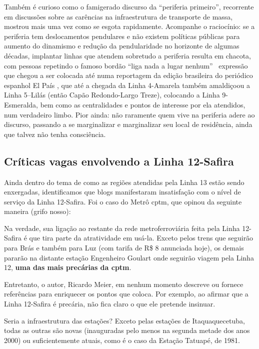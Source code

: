 \documentclass[11pt,fleqn]{book} %
\begin{document}
Também é curioso como o famigerado discurso da “periferia primeiro”, recorrente em discussões sobre as carências na infraestrutura de transporte de massa, mostrou mais uma vez como se esgota rapidamente. Acompanhe o raciocínio: se a periferia tem deslocamentos pendulares e não existem políticas públicas para aumento do dinamismo e redução da pendularidade no horizonte de algumas décadas, implantar linhas que atendem sobretudo a periferia resulta em chacota, com pessoas repetindo o famoso bordão “liga nada a lugar nenhum” \textemdash\ expressão que chegou a ser colocada até numa reportagem da edição brasileira do periódico espanhol El País \textemdash, que até a chegada da Linha 4-Amarela também amaldiçoou a Linha 5–Lilás (então Capão Redondo-Largo Treze), colocando a Linha 9-Esmeralda, bem como as centralidades e pontos de interesse por ela atendidos, num verdadeiro limbo. Pior ainda: não raramente quem vive na periferia adere ao discurso, passando a se marginalizar e marginalizar seu local de residência, ainda que talvez não tenha consciência.

\subsection{Críticas vagas envolvendo a Linha 12-Safira}

Ainda dentro do tema de como as regiões atendidas pela Linha 13 estão sendo enxergadas, identificamos que blogs manifestaram insatisfação com o nível de serviço da Linha 12-Safira. Foi o caso do Metrô \gls{cptm}, que opinou da seguinte maneira (grifo nosso):

\begin{citacao}
	Na verdade, sua ligação ao restante da rede metroferroviária feita pela Linha 12-Safira é que tira parte da atratividade em usá-la. Exceto pelos trens que seguirão para Brás e também para Luz (com tarifa de R\$ 8 anunciada hoje), os demais pararão na distante estação Engenheiro Goulart onde seguirão viagem pela Linha 12, \textbf{uma das mais precárias da \gls{cptm}}.
\end{citacao}

Entretanto, o autor, Ricardo Meier, em nenhum momento descreve ou fornece referências para enriquecer os pontos que coloca. Por exemplo, ao afirmar que a Linha 12-Safira é precária, não fica claro o que ele pretende insinuar.

Seria a infraestrutura das estações? Exceto pelas estações de Itaquaquecetuba, todas as outras são novas (inauguradas pelo menos na segunda metade dos anos 2000) ou suficientemente atuais, como é o caso da Estação Tatuapé, de 1981.
\end{document}
